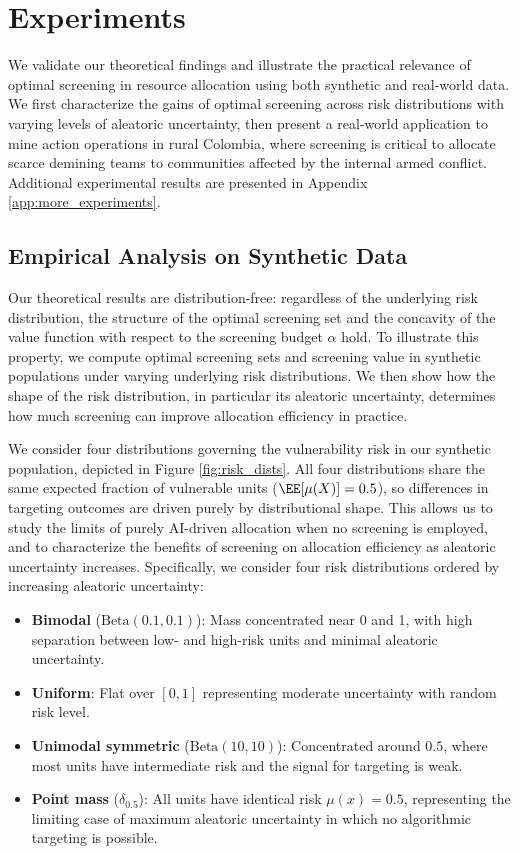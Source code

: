\section{Experiments}

We validate our theoretical findings and illustrate the practical relevance of optimal screening in resource allocation using both synthetic and real-world data. We first characterize the gains of optimal screening across risk distributions with varying levels of aleatoric uncertainty, then present a real-world application to mine action operations in rural Colombia, where screening is critical to allocate scarce demining teams to communities affected by the internal armed conflict. Additional experimental results are presented in Appendix \ref{app:more_experiments}.


\subsection{Empirical Analysis on Synthetic Data}

Our theoretical results are distribution-free: regardless of the underlying risk distribution, the structure of the optimal screening set and the concavity of the value function  with respect to the screening budget $\alpha$ hold. To illustrate this property, we compute optimal screening sets and screening value in synthetic populations under varying underlying risk distributions. We then show how the shape of the risk distribution, in particular its aleatoric uncertainty, determines how much screening can improve allocation efficiency in practice.

We consider four distributions governing the vulnerability risk in our synthetic population, depicted in Figure \ref{fig:risk_dists}. All four distributions share the same expected fraction of vulnerable units ($\EE[\mu(X)]= 0.5$), so differences in targeting outcomes are driven purely by distributional shape. This allows us to study the limits of purely AI-driven allocation when no screening is employed, and to characterize the benefits of screening on allocation efficiency as aleatoric uncertainty increases. Specifically, we consider four risk distributions ordered by increasing aleatoric uncertainty:

\begin{itemize}
    \item \textbf{Bimodal} ($\text{Beta}(0.1, 0.1)$): Mass concentrated near 0 and 1, with high separation between low- and high-risk units and minimal aleatoric uncertainty.
    \item \textbf{Uniform}: Flat over $[0,1]$ representing moderate uncertainty with random risk level.
    \item \textbf{Unimodal symmetric} ($\text{Beta}(10,10)$): Concentrated around $0.5$, where most units have intermediate risk and the signal for targeting is weak.
    \item \textbf{Point mass} ($\delta_{0.5}$): All units have identical risk $\mu(x) = 0.5$, representing the limiting case of maximum aleatoric uncertainty in which no algorithmic targeting is possible.
\end{itemize}

